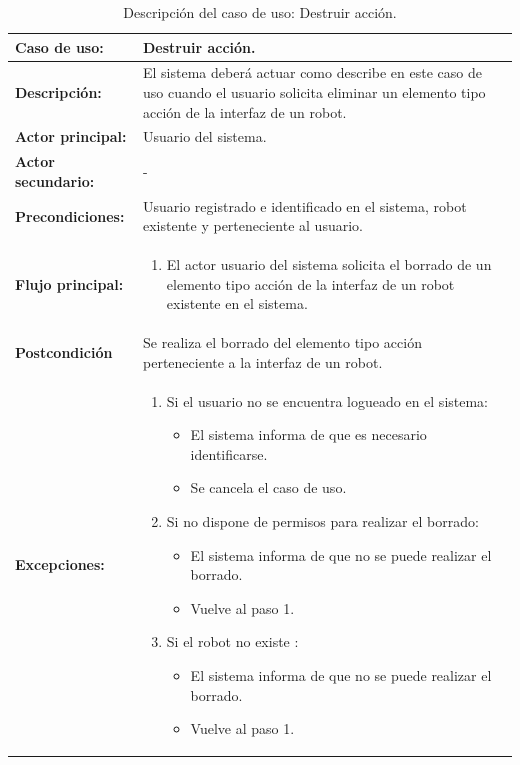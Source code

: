 \begin{table}[H]
  \begin{center}
    \begin{tabular}{|p{3.5cm}|p{10cm}|}
      \hline
      {\textbf{Caso de uso:}} & { Destruir acción.} \\
      \hline
      {\textbf{Descripción:}} & { El sistema deberá actuar como describe en este caso de uso cuando el usuario solicita eliminar un elemento tipo acción de la interfaz de un robot.} \\
     \hline
      {\textbf{Actor principal:}} & { Usuario del sistema.} \\
      \hline
      {\textbf{Actor secundario:}} & { - } \\
      \hline
      {\textbf{Precondiciones:}} & { Usuario registrado e identificado en el sistema, robot existente y perteneciente al usuario. } \\
     \hline   
    {\textbf{Flujo principal:}} & { 
      \begin{enumerate}
	\item El actor usuario del sistema solicita el borrado de un elemento tipo acción de la interfaz de un robot existente en el sistema.
      \end{enumerate}
      } \\
     \hline
     {\textbf{Postcondición}} & {Se realiza el borrado del elemento tipo acción perteneciente a la interfaz de un robot.}\\
     \hline
         {\textbf{Excepciones:}} & {
         \begin{enumerate}
         
          \item Si el usuario no se encuentra logueado en el sistema:
	  \begin{itemize}
	    \item El sistema informa de que es necesario identificarse.
	    \item Se cancela el caso de uso.
	  \end{itemize}
         
          \item Si no dispone de permisos para realizar el borrado:
          \begin{itemize}
           \item El sistema informa de que no se puede realizar el borrado.
           \item Vuelve al paso 1.
          \end{itemize}
	  \item Si el robot no existe :
	    \begin{itemize}
	      \item El sistema informa de que no se puede realizar el borrado.
	      \item Vuelve al paso 1.
	   \end{itemize}	   
         \end{enumerate}
         }\\
     \hline
    \end{tabular}
  \end{center}
\caption{Descripción del caso de uso: Destruir acción.}
\end{table}



